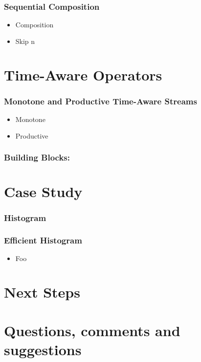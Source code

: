 \documentclass[aspectratio=169,10pt]{beamer}
\begin{document}
\begin{frame}
  \frametitle{Sequential Composition}
  \begin{itemize}
    \item Composition
    \item Skip n
  \end{itemize}
\end{frame}

\section{Time-Aware Operators}

\begin{frame}
  \frametitle{Monotone and Productive Time-Aware Streams}
  \begin{itemize}
    \item Monotone
    \item Productive
  \end{itemize}
\end{frame}

\begin{frame}[fragile]
  \frametitle{Building Blocks: }

\end{frame}

\section{Case Study}

\begin{frame}
  \frametitle{Histogram}
\end{frame}

\begin{frame}
  \frametitle{Efficient Histogram}
  \begin{itemize}
    \item Foo
  \end{itemize}
\end{frame}

\section{Next Steps}

\section{Questions, comments and suggestions}
\end{document}
